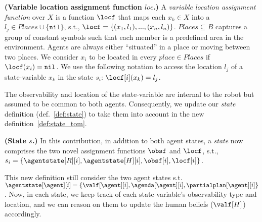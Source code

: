 \begin{definition}
    \textbf{(Variable location assignment function $loc$.)} A \emph{variable location assignment function} over $X$ is a function $\locf$ that maps each $x_k \in X$ into a $l_j \in Places \cup \{ \texttt{nil} \}$, s.t., $\locf = \{ (x_1,l_1), ..., (x_n,l_n) \}$. 
    $Places \subseteq B$ captures a group of constant symbols such that each member is a predefined area in the environment. 
    Agents are always either ``situated'' in a place or moving between two places. 
    We consider $x_i$ to be located in every $place \in Places$ if $\locf(x_i)=\texttt{nil}$. 
    We use the following notation to access the location $l_j$ of a state-variable $x_k$ in the state $s_i$: $\locf[i](x_k) = l_j$.
    \label{def:variable_location_assignment_function}
\end{definition}


The observability and location of the state-variable are internal to the robot but assumed to be common to both agents. Consequently, we update our \textit{state} definition (def.~\ref{def:state}) to take them into account in the new definition~\ref{def:state_tom}.

\begin{definition}
    \textbf{(State $s$.)} In this contribution, in addition to both agent states, a \emph{state} now comprises the two novel assignment functions $\obsf$ and $\locf$, s.t., $s_i = \{ \agentstate[R][i], \agentstate[H][i], \obsf[i], \locf[i] \}$.
    \label{def:state_tom}
\end{definition}

This new definition still consider the two agent states s.t. $\agentstate[\agent][i] = \{ \valf[\agent][i], \agenda[\agent][i], \partialplan[\agent][i] \}$. Now, in each state, we keep track of each state-variable's observability type and location, and we can reason on them to update the human beliefs ($\valf[H]$) accordingly. 

